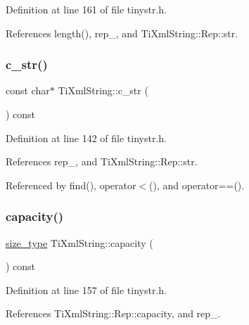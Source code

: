 Definition at line 161 of file tinystr.\+h.



References length(), rep\+\_\+, and Ti\+Xml\+String\+::\+Rep\+::str.

\hypertarget{class_ti_xml_string_ae2bd36349215612ebcc3cb221c30bd3d}{}\label{class_ti_xml_string_ae2bd36349215612ebcc3cb221c30bd3d} 
\subsubsection{\texorpdfstring{c\+\_\+str()}{c\_str()}}
{\footnotesize\ttfamily const char$\ast$ Ti\+Xml\+String\+::c\+\_\+str (\begin{DoxyParamCaption}{ }\end{DoxyParamCaption}) const\hspace{0.3cm}{\ttfamily [inline]}}



Definition at line 142 of file tinystr.\+h.



References rep\+\_\+, and Ti\+Xml\+String\+::\+Rep\+::str.



Referenced by find(), operator$<$(), and operator==().

\hypertarget{class_ti_xml_string_a0ca248f026e698f79b8aa4c9ab8e1571}{}\label{class_ti_xml_string_a0ca248f026e698f79b8aa4c9ab8e1571} 
\subsubsection{\texorpdfstring{capacity()}{capacity()}}
{\footnotesize\ttfamily \hyperlink{class_ti_xml_string_abeb2c1893a04c17904f7c06546d0b971}{size\+\_\+type} Ti\+Xml\+String\+::capacity (\begin{DoxyParamCaption}{ }\end{DoxyParamCaption}) const\hspace{0.3cm}{\ttfamily [inline]}}



Definition at line 157 of file tinystr.\+h.



References Ti\+Xml\+String\+::\+Rep\+::capacity, and rep\+\_\+.

\hypertarget{class_ti_xml_string_ab20e06e4c666abf3bdbfb3a1191d4888}{}\label{class_ti_xml_string_ab20e06e4c666abf3bdbfb3a1191d4888} 
